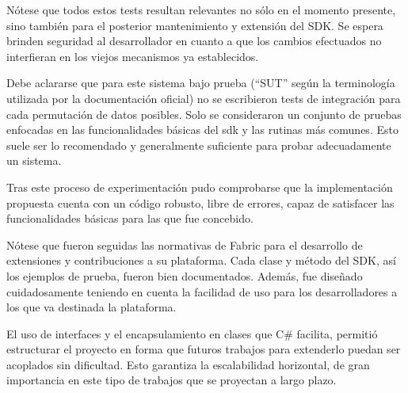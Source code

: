 N\'otese que todos estos tests resultan relevantes no s\'olo en el momento presente, sino tambi\'en para el posterior mantenimiento y extensi\'on del SDK. Se espera brinden seguridad al desarrollador en cuanto a que los cambios efectuados no interfieran en los viejos mecanismos ya establecidos.






Debe aclararse que para este sistema bajo prueba (“SUT” seg\'un la terminolog\'ia utilizada por la documentaci\'on oficial) no se escribieron tests de integración para cada permutación de datos posibles. Solo se consideraron un conjunto de pruebas enfocadas en las funcionalidades b\'asicas del sdk y las rutinas m\'as comunes. Esto suele ser lo recomendado y generalmente suficiente para probar adecuadamente un sistema. 


Tras este proceso de experimentaci\'on pudo comprobarse que la implementaci\'on propuesta cuenta con un c\'odigo robusto, libre de errores, capaz de satisfacer las funcionalidades b\'asicas para las que fue concebido.

N\'otese que fueron seguidas las normativas de Fabric para el desarrollo de extensiones y contribuciones a su plataforma. Cada clase y m\'etodo del SDK, as\'i los ejemplos de prueba, fueron bien documentados. Adem\'as, fue dise\~nado cuidadosamente teniendo en cuenta la facilidad de uso para los desarrolladores a los que va destinada la plataforma.

El uso de interfaces y el encapsulamiento en clases que C\# facilita, permiti\'o estructurar el proyecto en forma que futuros trabajos para extenderlo puedan ser acoplados sin dificultad. Esto garantiza la escalabilidad horizontal, de gran importancia en este tipo de trabajos que se proyectan a largo plazo. 

